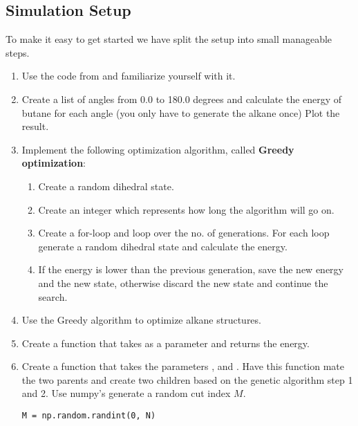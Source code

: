 \documentclass{article}
\begin{document}
\newpage

\subsection{Simulation Setup}

To make it easy to get started we have split the setup into small manageable steps.

\begin{enumerate}
    \item Use the code from  and familiarize yourself with it.

    \item Create a list of angles from 0.0 to 180.0 degrees and calculate the energy of butane for each angle (you only have to generate the alkane once)
    Plot the result.

    \item Implement the following optimization algorithm, called \textbf{Greedy optimization}:
        \begin{enumerate}
            \item Create a random dihedral state.
            \item Create an integer  which represents how long the algorithm will go on.
            \item Create a for-loop and loop over the no. of generations. 
            For each loop generate a random dihedral state and calculate the energy.
            \item If the energy is lower than the previous generation, save the new energy and the new state, otherwise discard the new state and continue the search.
        \end{enumerate}

    \item Use the Greedy algorithm to optimize alkane structures.

    \item Create a function that takes  as a parameter and returns the energy.

    \item Create a function that takes the parameters
    ,
     and
    .
    Have this function mate the two parents and create two children based on the genetic algorithm step 1 and 2.
    Use numpy's  generate a random cut index $M$.

\begin{lstlisting}
M = np.random.randint(0, N)
\end{lstlisting}


\end{enumerate}
\end{document}
